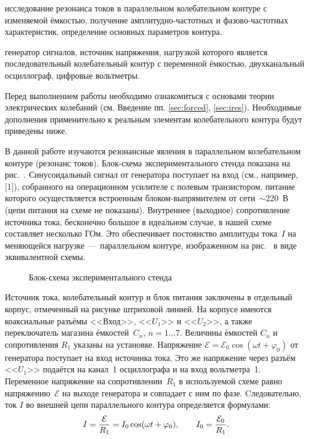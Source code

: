 
\begin{lab:aim}
	исследование резонанса токов в параллельном колебательном контуре с
изменяемой ёмкостью, получение амплитудно-частотных и
фазово-частотных характеристик, определение основных параметров контура.
\end{lab:aim}

\begin{lab:equipment}
	генератор сигналов, источник напряжения, нагрузкой которого является
последовательный колебательный контур с переменной ёмкостью, двухканальный
осциллограф, цифровые вольтметры.
\end{lab:equipment}

Перед выполнением работы необходимо ознакомиться с основами теории электрических  
колебаний (см. Введение пп. \ref{sec:forced}, \ref{sec:ires}).
Необходимые дополнения применительно к реальным элементам колебательного
контура будут приведены ниже.

\experiment
В данной работе изучаются резонансные явления в параллельном колебательном
контуре (резонанс токов). Блок-схема экспериментального стенда 
показана на рис.~. Синусоидальный сигнал
от генератора поступает на вход  (см., например, [1]), собранного на операционном усилителе с полевым
транзистором, питание которого осуществляется встроенным блоком-выпрямителем от
сети~$\sim220$~В (цепи питания на схеме не показаны).  Внутреннее (выходное)
сопротивление источника тока, бесконечно большое в идеальном случае, в нашей
схеме составляет несколько ГОм. Это обеспечивает постоянство амплитуды тока~$I$
на меняющейся нагрузке~--- параллельном контуре, изображенном на 
рис.~ в виде эквивалентной схемы.

\begin{figure}[h!]
    \centering
	\caption{Блок-схема экспериментального стенда}
\end{figure}


Источник тока, колебательный контур и блок питания заключены в отдельный корпус,
отмеченный на рисунке штриховой линией. 
На корпусе имеются коаксиальные разъёмы <<Вход>>,
<<${U}_1$>> и <<${U}_2$>>, а также переключатель магазина ёмкостей~$C_n$,
$n=1\ldots7$. Величины ёмкостей $C_n$ и сопротивления $R_1$ указаны на установке.
Напряжение $\mathcal{E}=\mathcal{E}_0\cos(\omega t+\varphi_0)$ от генератора поступает на
вход источника тока. Это же напряжение через разъём <<${U}_1$>> подаётся на
канал~1 осциллографа и на вход вольтметра~1. Переменное напряжение на
сопротивлении~$R_1$ в используемой схеме равно напряжению~$\mathcal{E}$ 
на выходе генератора и совпадает с ним по фазе. 
Cледовательно, ток $I$ во внешней цепи параллельного контура 
определяется формулами:
\begin{equation}\eqmark{2.3.1}
	I=\frac{\mathcal{E}}{R_1}=I_0\cos(\omega t+\varphi_0), \qquad 
    I_0=\frac{\mathcal{E}_0}{R_1}.
\end{equation}

